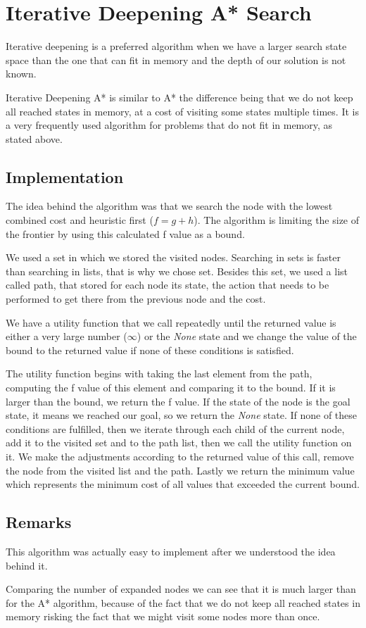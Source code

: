 \section{Iterative Deepening A* Search}
\label{sec:idastar}

Iterative deepening is a preferred algorithm when we have a larger search state space than the one that can fit in memory and the depth of our solution is not known. 

Iterative Deepening A* is similar to A* the difference being that we do not keep all reached states in memory, at a cost of visiting some states multiple times. It is a very frequently used algorithm for problems that do not fit in memory, as stated above.

\subsection{Implementation}

The idea behind the algorithm was that we search the node with the lowest combined cost and heuristic first ($f = g + h$). The algorithm is limiting the size of the frontier by using this calculated f value as a bound.

We used a set in which we stored the visited nodes. Searching in sets is faster than searching in lists, that is why we chose set.
Besides this set, we used a list called path, that stored for each node its state, the action that needs to be performed to get there from the previous node and the cost.

We have a utility function that we call repeatedly until the returned value is either a very large number ($\infty$)  or  the \textit{None} state and we change the value of the bound to the returned value if none of these conditions is satisfied. 

The utility function begins with taking the last element from the path, computing the f value of this element and comparing it to the bound. If it is larger than the bound, we return the f value. If the state of the node is the goal state, it means we reached our goal, so we return the \textit{None} state. If none of these conditions are fulfilled, then we iterate through each child of the current node, add it to the visited set and to the path list, then we call the utility function on it. We make the adjustments according to the returned value of this call, remove the node from the visited list and the path. 
Lastly we return the minimum value which represents the minimum cost of all values that exceeded the current bound. 

\subsection{Remarks}

This algorithm was actually easy to implement after we understood the idea behind it. 

Comparing the number of expanded nodes we can see that it is much larger than for the A* algorithm, because of the fact that we do not keep all reached states in memory risking the fact that we might visit some nodes more than once. 
